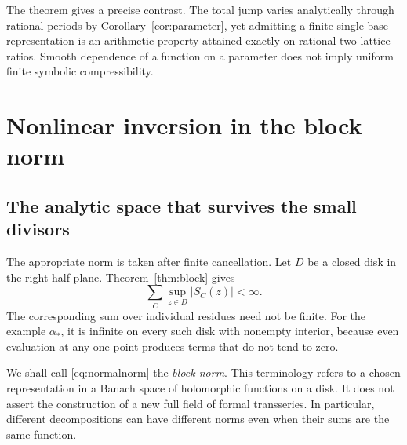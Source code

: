 \documentclass[11pt,a4paper]{article}
\numberwithin{equation}{section}
\theoremstyle{definition}
\theoremstyle{remark}
\begin{document}
The theorem gives a precise contrast. The total jump varies analytically
through rational periods by Corollary~\ref{cor:parameter}, yet admitting a
finite single-base representation is an arithmetic property attained
exactly on rational two-lattice ratios. Smooth dependence of a function
on a parameter does not imply uniform finite symbolic compressibility.

\section{Nonlinear inversion in the block norm}
\label{sec:inverse}

\subsection{The analytic space that survives the small divisors}
The appropriate norm is taken after finite cancellation. Let $D$ be a
closed disk in the right half-plane. Theorem~\ref{thm:block} gives
\begin{equation}
 \sum_C\sup_{z\in D}|S_C(z)|<\infty.
 \label{eq:normalnorm}
\end{equation}
The corresponding sum over individual residues need not be finite.
For the example $\alpha_*$, it is infinite on every such disk with
nonempty interior, because even evaluation at any one point produces
terms that do not tend to zero.

We shall call \eqref{eq:normalnorm} the \emph{block norm}. This terminology
refers to a chosen representation in a Banach space of holomorphic
functions on a disk. It does not assert the construction of a new full
field of formal transseries. In particular, different decompositions can
have different norms even when their sums are the same function.
\end{document}
